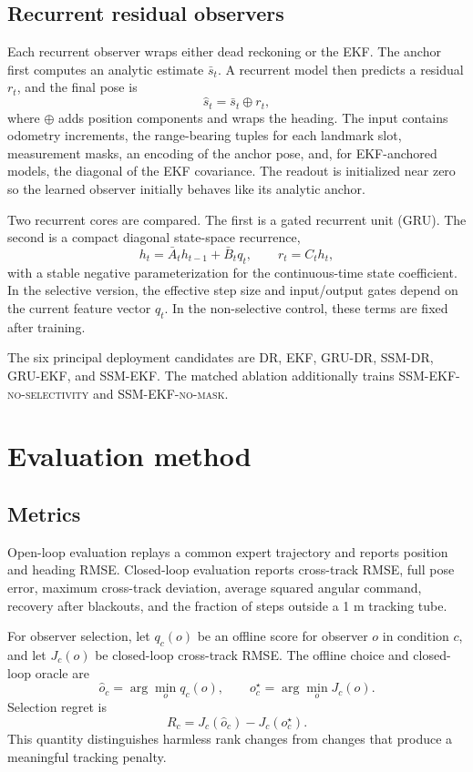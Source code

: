 \documentclass[11pt]{article}
\newcommand{\obs}[1]{\textsc{#1}}
\begin{document}
\subsection{Recurrent residual observers}
Each recurrent observer wraps either dead reckoning or the EKF. The anchor first computes an analytic estimate $\bar s_t$. A recurrent model then predicts a residual $r_t$, and the final pose is
\begin{equation}
 \hat s_t = \bar s_t \oplus r_t,
\end{equation}
where $\oplus$ adds position components and wraps the heading. The input contains odometry increments, the range-bearing tuples for each landmark slot, measurement masks, an encoding of the anchor pose, and, for EKF-anchored models, the diagonal of the EKF covariance. The readout is initialized near zero so the learned observer initially behaves like its analytic anchor.

Two recurrent cores are compared. The first is a gated recurrent unit (GRU). The second is a compact diagonal state-space recurrence,
\begin{equation}
 h_t=\bar A_t h_{t-1}+\bar B_t q_t, \qquad r_t=C_t h_t,
\end{equation}
with a stable negative parameterization for the continuous-time state coefficient. In the selective version, the effective step size and input/output gates depend on the current feature vector $q_t$. In the non-selective control, these terms are fixed after training.

The six principal deployment candidates are \obs{DR}, \obs{EKF}, \obs{GRU-DR}, \obs{SSM-DR}, \obs{GRU-EKF}, and \obs{SSM-EKF}. The matched ablation additionally trains \obs{SSM-EKF-no-selectivity} and \obs{SSM-EKF-no-mask}.

\section{Evaluation method}
\subsection{Metrics}
Open-loop evaluation replays a common expert trajectory and reports position and heading RMSE. Closed-loop evaluation reports cross-track RMSE, full pose error, maximum cross-track deviation, average squared angular command, recovery after blackouts, and the fraction of steps outside a 1 m tracking tube.

For observer selection, let $q_c(o)$ be an offline score for observer $o$ in condition $c$, and let $J_c(o)$ be closed-loop cross-track RMSE. The offline choice and closed-loop oracle are
\begin{equation}
 \hat o_c=\arg\min_o q_c(o), \qquad o_c^\star=\arg\min_o J_c(o).
\end{equation}
Selection regret is
\begin{equation}
 R_c=J_c(\hat o_c)-J_c(o_c^\star).
\end{equation}
This quantity distinguishes harmless rank changes from changes that produce a meaningful tracking penalty.
\end{document}
